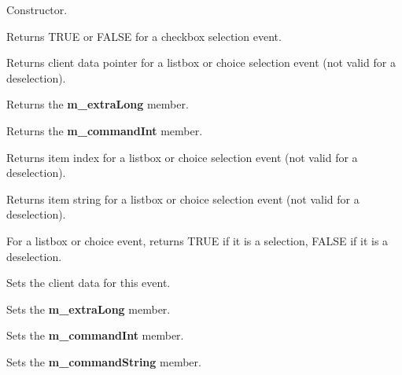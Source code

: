 

Constructor.



Returns TRUE or FALSE for a checkbox selection event.



Returns client data pointer for a listbox or choice selection event
(not valid for a deselection).



Returns the {\bf m\_extraLong} member.



Returns the {\bf m\_commandInt} member.



Returns item index for a listbox or choice selection event (not valid for
a deselection).



Returns item string for a listbox or choice selection event (not valid for
a deselection).



For a listbox or choice event, returns TRUE if it is a selection, FALSE if it
is a deselection.



Sets the client data for this event.



Sets the {\bf m\_extraLong} member.



Sets the {\bf m\_commandInt} member.



Sets the {\bf m\_commandString} member.


